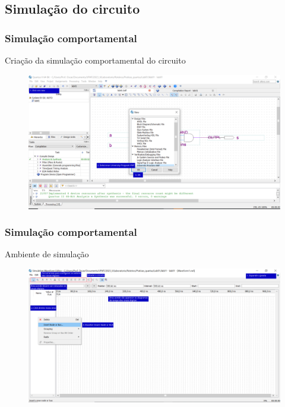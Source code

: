 \documentclass{CPSPresentation}
\begin{document}
\subsection{Simulação do circuito}

\begin{frame}
	\frametitle{Simulação comportamental}
	
	\begin{block}{}
		\justifying
		Criação da simulação comportamental do circuito
	\end{block}
	
	
	\begin{figure}[h]
		\centering
		\includegraphics[width=1.02\textwidth]{quartus/fig17.pdf}
	\end{figure}
	
	
\end{frame}

\begin{frame}
	\frametitle{Simulação comportamental}
	
	\begin{block}{}
		\justifying
		Ambiente de simulação
	\end{block}
	
	\begin{figure}[h]
		\centering
		\includegraphics[width=1.02\textwidth]{quartus/fig18.pdf}
	\end{figure}
	
	
\end{frame}
\end{document}

